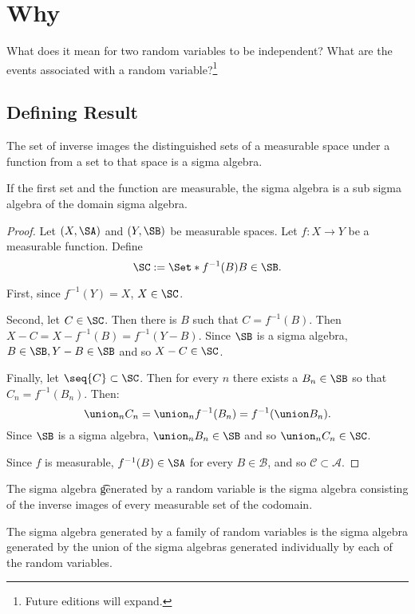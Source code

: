 
\section*{Why}

What does it mean for two random variables to be independent?
What are the events associated with a random variable?\footnote{Future editions will expand.}

\subsection*{Defining Result}

\begin{proposition}
The set of inverse images the distinguished sets of a measurable space under a function from a set to that space is a sigma algebra.

If the first set and the function are measurable, the sigma algebra is a sub sigma algebra of the domain sigma algebra.

\begin{proof}Let $(X, \SA)$ and $(Y, \SB)$ be measurable spaces.
Let $f: X \to Y$ be a measurable function. Define
\[
\SC := \Set*{f^{-1}(B)}{B \in \SB}.
\]

First, since $f^{-1}(Y) = X$, $X \in \SC$.

Second, let $C \in \SC$. Then there is $B$ such that $C = f^{-1}(B)$. Then $X - C = X - f^{-1}(B) = f^{-1}(Y - B)$.
Since $\SB$ is a sigma algebra, $B \in \SB, Y - B \in \SB$ and so $X - C \in \SC$.

Finally, let $\seq{C} \subset \SC$.
Then for every $n$ there exists a $B_n \in \SB$ so that $C_n = f^{-1}(B_n)$.
Then:
\[
\union_{n} C_n = \union_n f^{-1}(B_n) = f^{-1}(\union B_n).
\]
Since $\SB$ is a sigma algebra,
$\union_n B_n \in \SB$ and so $\union_{n} C_n \in \SC$.

Since $f$ is measurable, $f^{-1}(B) \in \SA$ for every $B \in \mathcal{B} $, and so $\mathcal{C}  \subset \mathcal{A} $.
\end{proof}
\end{proposition}

The sigma algebra \t{generated by a random variable} is the sigma algebra consisting of the inverse images of every measurable set of the codomain.

The sigma algebra generated by a family of random variables is the sigma algebra generated by the union of the sigma algebras generated individually by each of the random variables.

